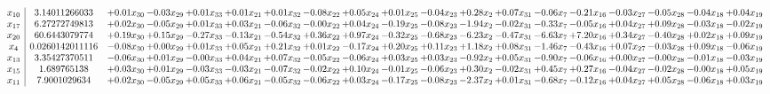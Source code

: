 \documentclass[9pt]{article}
\begin{document}
 \[\begin{array}{c| c c@{\hskip 2pt} c@{\hskip 2pt} c@{\hskip 2pt} c@{\hskip 2pt} c@{\hskip 2pt} c@{\hskip 2pt} c@{\hskip 2pt} c@{\hskip 2pt} c@{\hskip 2pt} c@{\hskip 2pt} c@{\hskip 2pt} c@{\hskip 2pt} c@{\hskip 2pt} c@{\hskip 2pt} c@{\hskip 2pt} c@{\hskip 2pt} c@{\hskip 2pt} }
 x_{10}   &  3.14011266033 & +  0.01 x_{30} & -0.03 x_{29} & +  0.01 x_{33} & +  0.01 x_{21} & +  0.01 x_{32} & -0.08 x_{22} & +  0.05 x_{24} & +  0.01 x_{25} & -0.04 x_{23} & +  0.28 x_{2} & +  0.07 x_{31} & -0.06 x_{7} & -0.21 x_{16} & -0.03 x_{27} & -0.05 x_{28} & -0.04 x_{18} & +  0.04 x_{19}\\
 x_{17}   &  6.27272749813 & +  0.02 x_{30} & -0.05 x_{29} & +  0.01 x_{33} & +  0.03 x_{21} & -0.06 x_{32} & -0.00 x_{22} & +  0.04 x_{24} & -0.19 x_{25} & -0.08 x_{23} & -1.94 x_{2} & -0.02 x_{31} & -0.33 x_{7} & -0.05 x_{16} & +  0.04 x_{27} & +  0.09 x_{28} & -0.03 x_{18} & -0.02 x_{19}\\
 x_{20}   &  60.6443079774 & +  0.19 x_{30} & +  0.15 x_{29} & -0.27 x_{33} & -0.13 x_{21} & -0.54 x_{32} & +  0.36 x_{22} & +  0.97 x_{24} & -0.32 x_{25} & -0.68 x_{23} & -6.23 x_{2} & -0.47 x_{31} & -6.63 x_{7} & +  7.20 x_{16} & +  0.34 x_{27} & -0.40 x_{28} & +  0.02 x_{18} & +  0.09 x_{19}\\
 x_{4}   &  0.0260142011116 & -0.08 x_{30} & +  0.00 x_{29} & +  0.01 x_{33} & +  0.05 x_{21} & +  0.21 x_{32} & +  0.01 x_{22} & -0.17 x_{24} & +  0.20 x_{25} & +  0.11 x_{23} & +  1.18 x_{2} & +  0.08 x_{31} & -1.46 x_{7} & -0.43 x_{16} & +  0.07 x_{27} & -0.03 x_{28} & +  0.09 x_{18} & -0.06 x_{19}\\
 x_{13}   &  3.35427370511 & -0.06 x_{30} & +  0.01 x_{29} & -0.00 x_{33} & +  0.04 x_{21} & +  0.07 x_{32} & -0.05 x_{22} & -0.06 x_{24} & +  0.03 x_{25} & +  0.03 x_{23} & -0.92 x_{2} & +  0.05 x_{31} & -0.90 x_{7} & -0.06 x_{16} & +  0.00 x_{27} & -0.00 x_{28} & -0.01 x_{18} & -0.03 x_{19}\\
 x_{15}   &  1.689765138 & +  0.03 x_{30} & +  0.01 x_{29} & -0.03 x_{33} & -0.03 x_{21} & -0.07 x_{32} & -0.02 x_{22} & +  0.10 x_{24} & -0.01 x_{25} & -0.06 x_{23} & +  0.30 x_{2} & -0.02 x_{31} & +  0.45 x_{7} & +  0.27 x_{16} & -0.04 x_{27} & -0.02 x_{28} & -0.00 x_{18} & +  0.05 x_{19}\\
 x_{11}   &  7.9001029634 & +  0.02 x_{30} & -0.05 x_{29} & +  0.05 x_{33} & +  0.06 x_{21} & -0.05 x_{32} & -0.06 x_{22} & +  0.03 x_{24} & -0.17 x_{25} & -0.08 x_{23} & -2.37 x_{2} & +  0.01 x_{31} & -0.68 x_{7} & -0.12 x_{16} & +  0.04 x_{27} & +  0.05 x_{28} & -0.06 x_{18} & +  0.03 x_{19}\\

\end{array}\]
\end{document}
